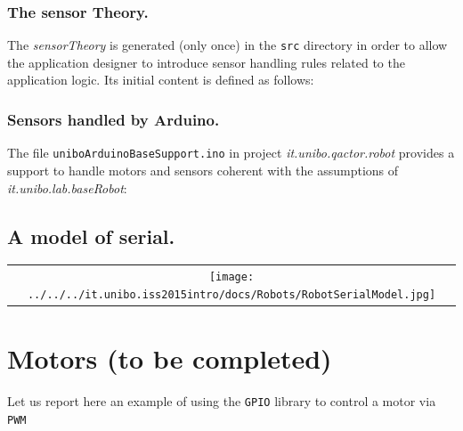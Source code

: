 \subsubsection{The sensor Theory.}

The \textit{sensorTheory} is generated (only once) in the \texttt{src} directory in order to allow the application designer to introduce sensor handling rules related to the application logic. Its initial content is defined as follows:



\subsubsection{Sensors handled by Arduino.}

The file \texttt{uniboArduinoBaseSupport.ino} in project \textit{it.unibo.qactor.robot} provides a support to handle motors and sensors coherent with  the assumptions of \textit{it.unibo.lab.baseRobot}:
 


\subsection{A model of serial.}

\begin{center}
\begin{tabular}{ c }
     \texttt{[image: ../../../it.unibo.iss2015intro/docs/Robots/RobotSerialModel.jpg]}\\
\end{tabular} 
\end{center}

\newpage   
\section{Motors (to be completed)}

Let us report here an example of using the \texttt{GPIO} library to control a motor via \texttt{PWM}



